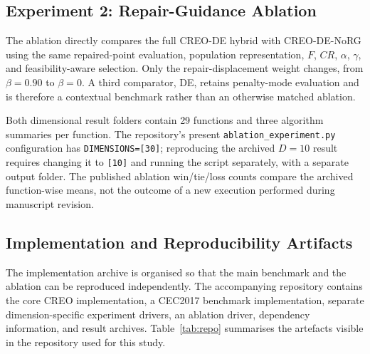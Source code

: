 \documentclass[journal]{IEEEtran}
\begin{document}
\subsection{Experiment 2: Repair-Guidance Ablation}

The ablation directly compares the full CREO-DE hybrid with CREO-DE-NoRG using the same repaired-point evaluation, population representation, $F$, $CR$, $\alpha$, $\gamma$, and feasibility-aware selection. Only the repair-displacement weight changes, from $\beta=0.90$ to $\beta=0$. A third comparator, DE, retains penalty-mode evaluation and is therefore a contextual benchmark rather than an otherwise matched ablation.

Both dimensional result folders contain 29 functions and three algorithm summaries per function. The repository's present \texttt{ablation\_experiment.py} configuration has \texttt{DIMENSIONS=[30]}; reproducing the archived $D=10$ result requires changing it to \texttt{[10]} and running the script separately, with a separate output folder. The published ablation win/tie/loss counts compare the archived function-wise means, not the outcome of a new execution performed during manuscript revision.

\subsection{Implementation and Reproducibility Artifacts}

The implementation archive is organised so that the main benchmark and the ablation can be reproduced independently. The accompanying repository contains the core CREO implementation, a CEC2017 benchmark implementation, separate dimension-specific experiment drivers, an ablation driver, dependency information, and result archives. Table~\ref{tab:repo} summarises the artefacts visible in the repository used for this study.
\end{document}
